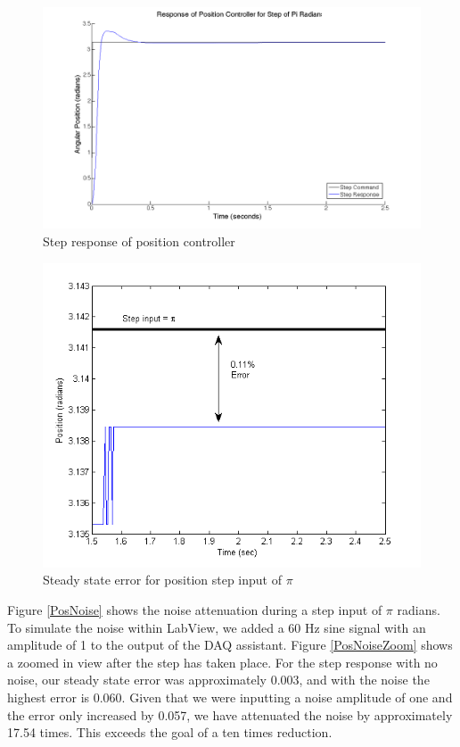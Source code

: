 \documentclass{article}
\theoremstyle{plain}
\theoremstyle{definition}
\theoremstyle{remark}
\begin{document}
\begin{figure}[htb]
\begin{center}
\includegraphics[width = 14cm]{posstep_1pi.png}
\caption{Step response of position controller}
\label{PosStepPi}
\end{center}
\end{figure}

\begin{figure}[htb]
\begin{center}
\includegraphics[width = 12cm]{positionStepError.png}
\caption{Steady state error for position step input of $\pi$}
\label{PosStepError}
\end{center}
\end{figure}

Figure \ref{PosNoise} shows the noise attenuation during a step input of $\pi$ radians. To simulate the noise within LabView, we added a 60 Hz sine signal with an amplitude of 1 to the output of the DAQ assistant. Figure \ref{PosNoiseZoom} shows a zoomed in view after the step has taken place. For the step response with no noise, our steady state error was approximately 0.003, and with the noise the highest error is 0.060. Given that we were inputting a noise amplitude of one and the error only increased by 0.057, we have attenuated the noise by approximately 17.54 times. This exceeds the goal of a ten times reduction.\\
\end{document}
